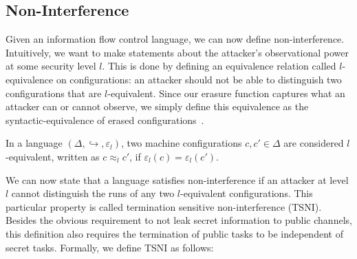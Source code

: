 \documentclass{llncs}
\begin{document}
\subsection{Non-Interference}

Given an information flow control language, we can now define non-interference.
Intuitively, we want to make statements about the attacker's observational
power at some security level \ensuremath{l}.  This is done by defining an equivalence
relation called \ensuremath{l}-equivalence on configurations: an attacker should
not be able to distinguish two configurations that are \ensuremath{l}-equivalent.
Since our erasure function captures what an attacker can or cannot observe, we simply define this
equivalence as the syntactic-equivalence of erased configurations~\cite{stefan:addressing-covert}.
\begin{definition}
    In a language \ensuremath{(\Delta,\hookrightarrow,\varepsilon_{l})}, two machine configurations
    \ensuremath{c,c'\in\Delta} are considered $l$-equivalent, written as \ensuremath{c\approx_lc'},
    if \ensuremath{\varepsilon_{l}(c)\mathrel{=}\varepsilon_{l}(c')}.
\end{definition}


We can now state that a language satisfies non-interference if an
attacker at level \ensuremath{l} cannot distinguish the runs of any two \ensuremath{l}-equivalent
configurations.
This particular property is called termination sensitive non-interference
(TSNI).  Besides the obvious requirement to not leak secret information
to public channels, this definition also requires the termination
of public tasks to be independent of secret tasks.
Formally, we define TSNI as follows:
\end{document}
